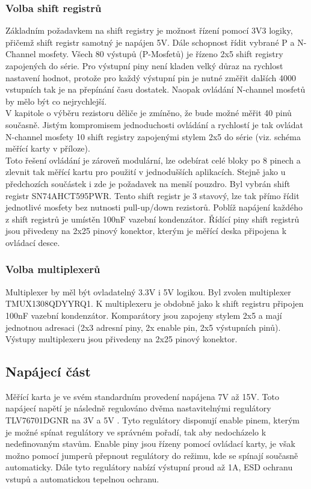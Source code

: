\subsubsection{Volba shift registrů}
Základním požadavkem na shift registry je možnost řízení pomocí 3V3 logiky, přičemž shift registr samotný je napájen 5V.
Dále schopnost řídit vybrané P a N-Channel mosfety. Všech 80 výstupů (P-Mosfetů) je řízeno 2x5 shift registry zapojených do série.
Pro výstupní piny není kladen velký důraz na rychlost nastavení hodnot,
protože pro každý výstupní pin je nutné změřit dalších 4000 vstupních tak je na přepínání času dostatek.
Naopak ovládání N-channel mosfetů by mělo být co nejrychlejší.\\

V kapitole o výběru rezistoru děliče je zmíněno, že bude možné měřit 40 pinů současně.
Jistým kompromisem jednoduchosti ovládání a rychlostí je tak ovládat N-channel mosfety 10 shift
registry zapojenými stylem 2x5 do série (viz. schéma měřící karty v příloze).\\

Toto řešení ovládání je zároveň modulární, lze odebírat celé bloky po 8 pinech a
zlevnit tak měřící kartu pro použití v jednodušších aplikacích. Stejně jako u předchozích součástek i zde
je požadavek na menší pouzdro. Byl vybrán shift registr SN74AHCT595PWR.
Tento shift registr je 3 stavový, lze tak přímo řídit jednotlivé mosfety bez nutnosti
pull-up/down rezistorů. Poblíž napájení každého z shift registrů je umístěn 100nF vazební kondenzátor.
Řídící piny shift registrů jsou přivedeny na 2x25 pinový konektor,
kterým je měřící deska připojena k ovládací desce\cite{shift_datasheet}.

\subsubsection{Volba multiplexerů}
Multiplexer by měl být ovladatelný 3.3V i 5V logikou. Byl zvolen multiplexer\\ TMUX1308QDYYRQ1.
K multiplexeru je obdobně jako k shift registru připojen 100nF vazební kondenzátor.
Komparátory jsou zapojeny stylem 2x5 a mají jednotnou adresaci (2x3 adresní piny, 2x enable pin, 2x5 výstupních pinů).
Výstupy multiplexeru jsou přivedeny na 2x25 pinový konektor\cite{mux_datasheet}.

\clearpage

\subsection{Napájecí část}
Měřící karta je ve svém
standardním provedení napájena 7V až 15V.
Toto napájecí napětí je následně regulováno
dvěma nastavitelnými regulátory TLV76701DGNR na 3V a 5V .
Tyto regulátory disponují enable pinem, kterým je možné spínat regulátory ve správném pořadí,
tak aby nedocházelo k nedefinovaným stavům. Enable piny jsou řízeny pomocí ovládací karty, je však možno
pomocí jumperů přepnout regulátory do režimu, kde se spínají současně automaticky.
Dále tyto regulátory nabízí výstupní proud až 1A, ESD ochranu vstupů a automatickou tepelnou ochranu.\cite{regulator_datasheet}\\

